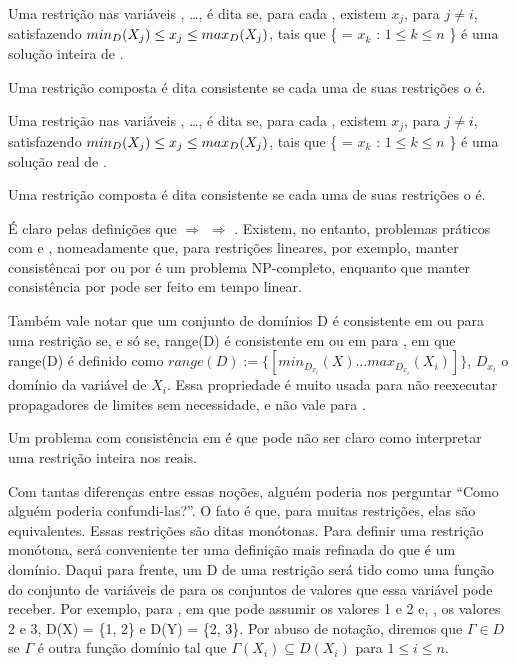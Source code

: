 \documentclass{article}
\begin{document}
\begin{definition}
  Uma restrição  nas variáveis , \dots,  é dita
  se, para cada , existem  $x_j$, para $j \neq i$,
  satisfazendo $min_D(\textit{$X_j$}) \leq x_j \leq max_D(\textit{$X_j$})$,
  tais que \{ = $x_k$ : $1 \leq k \leq n$ \}
  é uma solução inteira de .

  Uma restrição composta é dita \boundz{} consistente se cada uma de suas restrições o é.
\end{definition}

\begin{definition}
  Uma restrição  nas variáveis , \dots,  é dita
  se, para cada , existem  $x_j$, para $j \neq i$,
  satisfazendo $min_D(\textit{$X_j$}) \leq x_j \leq max_D(\textit{$X_j$})$,
  tais que \{ = $x_k$ : $1 \leq k \leq n$ \}
  é uma solução real de .

  Uma restrição composta é dita \boundr{} consistente se cada uma de suas restrições o é.
\end{definition}

É claro pelas definições que \boundd{} $\Rightarrow$ \boundz{} $\Rightarrow$ \boundr. Existem, no
entanto, problemas práticos com \boundd{} e \boundz, nomeadamente que, para restrições lineares, por
exemplo, manter consistêncai por \boundd{} ou por \boundz{} é um problema NP-completo, enquanto que
manter consistência por \boundr{} pode ser feito em tempo linear.

Também vale notar que um conjunto de domínios D é consistente em \boundz{} ou \boundr{} para uma
restrição  se, e só se, range(D) é consistente em \boundz{} ou em \boundr{} para
, em que range(D) é definido como $range(D) := \{[min_D_x_i(X) \ldots  max_D_x_i(X_i)]\}$, $D_x_i$ o domínio da
variável de  $X_i$. Essa propriedade é muito usada para não reexecutar propagadores
de limites sem necessidade, e não vale para \boundd{}.

Um problema com consistência em \boundr{} é que pode não ser claro como interpretar uma restrição
inteira nos reais.

Com tantas diferenças entre essas noções, alguém poderia nos perguntar ``Como alguém poderia
confundi-las?''. O fato é que, para muitas restrições, elas são equivalentes. Essas restrições são
ditas monótonas. Para definir uma restrição monótona, será conveniente ter uma definição mais
refinada do que é um domínio. Daqui para frente, um  D de uma restrição
 será tido como uma função do conjunto de variáveis de  para os conjuntos de
valores que essa variável pode receber. Por exemplo, para , em que 
pode assumir os valores 1 e 2 e, , os valores 2 e 3, D(X) = \{1, 2\} e D(Y) = \{2, 3\}. Por
abuso de notação, diremos que $\Gamma \in D$ se $\Gamma$ é outra função domínio tal que $\Gamma(X_i)
\subseteq D(X_i)$ para $1 \leq i \leq n$.
\end{document}
